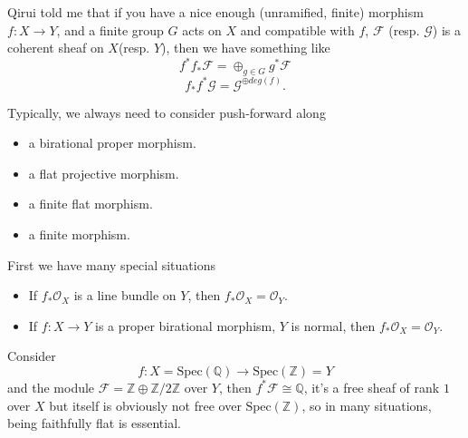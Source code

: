 \documentclass[../main.tex]{subfiles}
\begin{document}
\begin{remark}
Qirui told me that if you have a nice enough (unramified, finite) morphism $f:X\rightarrow Y$, and a finite group $G$ acts on $X$ and compatible with $f$, $\mathscr{F}$ (resp. $\mathscr{G}$) is a coherent sheaf on $X$(resp. $Y$), then we have something like
$$f^{*}f_{*}\mathscr{F}=\oplus_{g\in G}g^{*}\mathscr{F}$$
$$f_{*}f^{*}\mathscr{G}=\mathscr{G}^{\oplus deg(f)}.$$
\end{remark}
\begin{example}
Typically, we always need to consider push-forward along
\begin{itemize}
\item a birational proper morphism.
\item a flat projective morphism.
\item a finite flat morphism.
\item a finite morphism.
\end{itemize}
\end{example}


\begin{example}
First we have many special situations
\begin{itemize}
\item If $f_{*}\mathcal{O}_{X}$ is a line bundle on $Y$, then $f_{*}\mathcal{O}_{X}=\mathcal{O}_{Y}.$
\item If $f:X\rightarrow Y$ is a proper birational morphism, $Y$ is normal, then $f_{*}\mathcal{O}_{X}=\mathcal{O}_{Y}$. 
\end{itemize}
\end{example}


\begin{example}
Consider 
$$f:X=\mathrm{Spec}(\mathbb{Q})\rightarrow \mathrm{Spec}(\mathbb{Z})=Y$$
and the module $\mathscr{F}=\mathbb{Z}\oplus \mathbb{Z}/2\mathbb{Z}$ over $Y$, then $f^{*}\mathscr{F}\cong \mathbb{Q}$, it's a free sheaf of rank $1$ over $X$ but itself is obviously not free over $\mathrm{Spec}(\mathbb{Z})$, so in many situations, being faithfully flat is essential.
\end{example}
\end{document}
